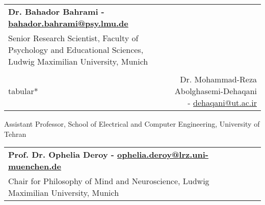 \documentclass[a4paper,10pt]{article}
\makeatletter
\newcommand{\resumeSubheading}[4]{
  \item
    \begin{tabular*}{0.98\textwidth}[t]{l@{\extracolsep{\fill}}r}
      \textbf{#1} & #2 \\
      #3 & #4 \\
    \end{tabular*}
}
\newcommand{\resumeSubHeadingListEnd}{\end{itemize}}
\newcommand{\resumeItemListStart}{\begin{itemize}\vspace{-4pt}}
\newcommand{\resumeItemListEnd}{\end{itemize}}
\makeatother
\begin{document}
\resumeSubheading
{Dr. Bahador Bahrami - \href{bbahrami@gmail.com}{bahador.bahrami@psy.lmu.de}}
{}{Senior Research Scientist, Faculty of Psychology and Educational Sciences, Ludwig Maximilian University, Munich}




\resumeSubheading
{Dr. Mohammad-Reza Abolghasemi-Dehaqani - \href{dehaqani@ut.ac.ir}{dehaqani@ut.ac.ir} }
{}{Assistant Professor, School of Electrical and Computer Engineering, University of Tehran}

\resumeSubheading
{Prof. Dr. Ophelia Deroy - \href{ophelia.deroy@lrz.uni-muenchen.de}{ophelia.deroy@lrz.uni-muenchen.de} }
{}{Chair for Philosophy of Mind and Neuroscience, Ludwig Maximilian University, Munich}


\resumeSubHeadingListEnd
\end{document}
